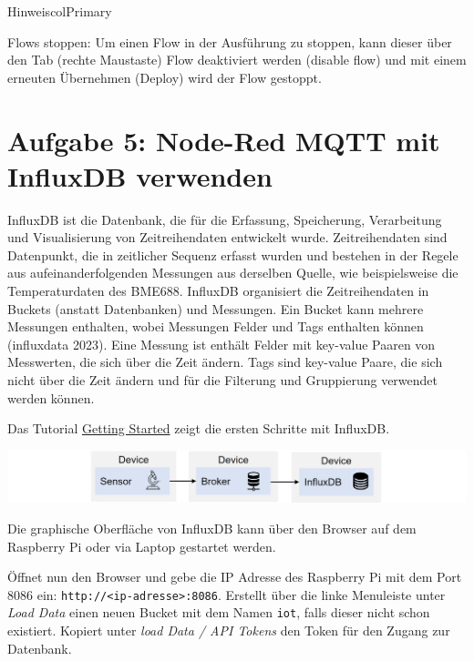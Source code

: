 \documentclass[
  11pt,
  a4paper,
  oneside, openany  ,captions=tableheading
]{scrbook}
\theoremstyle{remark}
\renewcommand{\markright}[1]{\def\chaptertitle{#1}} %
\begin{document}
\begin{boxtitle}{Hinweis}{colPrimary}

Flows stoppen: Um einen Flow in der Ausführung zu stoppen, kann dieser
über den Tab (rechte Maustaste) Flow deaktiviert werden (disable flow)
und mit einem erneuten Übernehmen (Deploy) wird der Flow gestoppt.

\end{boxtitle}

\section*{Aufgabe 5: Node-Red MQTT mit InfluxDB
verwenden}\label{aufgabe-5-node-red-mqtt-mit-influxdb-verwenden}

\markright{Aufgabe 5: Node-Red MQTT mit InfluxDB verwenden}

InfluxDB ist die Datenbank, die für die Erfassung, Speicherung,
Verarbeitung und Visualisierung von Zeitreihendaten entwickelt wurde.
Zeitreihendaten sind Datenpunkt, die in zeitlicher Sequenz erfasst
wurden und bestehen in der Regele aus aufeinanderfolgenden Messungen aus
derselben Quelle, wie beispielsweise die Temperaturdaten des BME688.
InfluxDB organisiert die Zeitreihendaten in Buckets (anstatt
Datenbanken) und Messungen. Ein Bucket kann mehrere Messungen enthalten,
wobei Messungen Felder und Tags enthalten können (influxdata 2023). Eine
Messung ist enthält Felder mit key-value Paaren von Messwerten, die sich
über die Zeit ändern. Tags sind key-value Paare, die sich nicht über die
Zeit ändern und für die Filterung und Gruppierung verwendet werden
können.

Das Tutorial
\href{https://docs.influxdata.com/influxdb/v2/get-started/}{Getting
Started} zeigt die ersten Schritte mit InfluxDB.

\includegraphics{images/mqtt-sensor-broker-influxdb.jpg}

Die graphische Oberfläche von InfluxDB kann über den Browser auf dem
Raspberry Pi oder via Laptop gestartet werden.

Öffnet nun den Browser und gebe die IP Adresse des Raspberry Pi mit dem
Port 8086 ein: \texttt{http://\textless{}ip-adresse\textgreater{}:8086}.
Erstellt über die linke Menuleiste unter \emph{Load Data} einen neuen
Bucket mit dem Namen \texttt{iot}, falls dieser nicht schon existiert.
Kopiert unter \emph{load Data / API Tokens} den Token für den Zugang zur
Datenbank.
\end{document}
